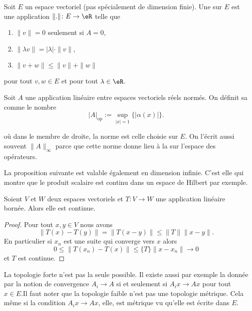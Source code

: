 Soit \( E\) un espace vectoriel (pas spécialement de dimension finie). Une   sur $E$ est une application $\| . \|\colon E\to \eR$ telle que
\begin{enumerate}
		\label{PgDefNorme}
	\item
		$\| v \|=0$ seulement si $A=0$,
	\item
		$\| \lambda v \|=| \lambda |\cdot\| v \|$,
	\item
		$\| v+w \|\leq\| v \|+\| w \|$

\end{enumerate}
pour tout $v,w\in E$ et pour tout $\lambda\in\eR$.

\begin{definition}
	Soit $A$ une application linéaire entre espaces vectoriels réels normés. On définit sa  comme le nombre
	\begin{equation}\label{EqThUCEJ}
		|A|_{\mbox{op}}:=\sup_{|x|=1}\{|\alpha(x)|\}.
	\end{equation}
\end{definition}
où dans le membre de droite, la norme est celle choisie sur \( E\). On l'écrit aussi souvent \( \| A \|_{\infty}\) parce que cette norme donne lieu à la  sur l'espace des opérateurs.

La proposition suivante est valable également en dimension infinie. C'est elle qui montre que le produit scalaire est continu dans un espace de Hilbert par exemple.
\begin{proposition}     \label{PropmEJjLE}
    Soient \( V\) et \( W\) deux espaces vectoriels et \( T\colon V\to W\) une application linéaire bornée. Alors elle est continue.
\end{proposition}

\begin{proof}
    Pour tout \( x,y\in V\) nous avons
    \begin{equation}
        \| T(x)-T(y) \|=\| T(x-y) \|\leq \| T \|\| x-y \|.
    \end{equation}
    En particulier si \( x_n\) est une suite qui converge vers \( x\) alors
    \begin{equation}
        0\leq \| T(x_n)-T(x) \|\leq \{ T \}\| x-x_n \|\to 0
    \end{equation}
    et \( T\) est continue.
\end{proof}

La topologie forte n'est pas la seule possible. Il existe aussi par exemple la  donnée par la notion de convergence \( A_i\to A\) si et seulement si \( A_ix\to Ax\) pour tout \( x\in E\).Il faut noter que la topologie faible n'est pas une topologie métrique. Cela même si la condition \( A_ix\to Ax\), elle, est métrique vu qu'elle est écrite dans \( E\).

